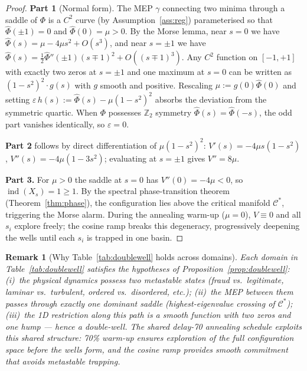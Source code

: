 \documentclass[11pt,a4paper]{article}
\newcommand{\Cman}{\mathcal{C}^*}
\DeclareMathOperator{\ind}{ind}
\newtheorem{remark}[theorem]{Remark}
\begin{document}
\begin{proof}
\textbf{Part 1} (Normal form).
The MEP $\gamma$ connecting two minima through a saddle of
$\Phi$ is a $C^2$ curve (by Assumption~\ref{ass:reg})
parameterised so that $\hat\Phi(\pm 1)=0$ and $\hat\Phi(0)=\mu>0$.
By the Morse lemma, near $s=0$ we have
$\hat\Phi(s)=\mu - 4\mu s^2 + O(s^3)$, and near $s=\pm 1$
we have $\hat\Phi(s)=\tfrac{1}{2}\hat\Phi''(\pm 1)(s\mp 1)^2
+O((s\mp 1)^3)$.
Any $C^2$ function on $[-1,+1]$ with exactly two zeros at
$s=\pm 1$ and one maximum at $s=0$ can be written as
$(1-s^2)^2\cdot g(s)$ with $g$ smooth and positive.
Rescaling $\mu:=g(0)\hat\Phi(0)$ and setting
$\varepsilon\,h(s):=\hat\Phi(s)-\mu(1-s^2)^2$ absorbs
the deviation from the symmetric quartic.
When $\Phi$ possesses $\mathbb{Z}_2$ symmetry $\hat\Phi(s)=\hat\Phi(-s)$,
the odd part vanishes identically, so $\varepsilon=0$.

\textbf{Part 2} follows by direct differentiation of
$\mu(1-s^2)^2$: $V'(s)=-4\mu s(1-s^2)$, $V''(s)=
-4\mu(1-3s^2)$; evaluating at $s=\pm 1$ gives $V''=8\mu$.

\textbf{Part 3.}
For $\mu>0$ the saddle at $s=0$ has
$V''(0)=-4\mu<0$, so $\ind(X_s)=1\ge 1$.
By the spectral phase-transition theorem
(Theorem~\ref{thm:phase}), the configuration lies above
the critical manifold $\Cman$, triggering the Morse alarm.
During the annealing warm-up ($\mu=0$), $V\equiv 0$ and all
$s_i$ explore freely; the cosine ramp breaks this degeneracy,
progressively deepening the wells until each $s_i$ is trapped
in one basin.%
\end{proof}

\begin{remark}[Why Table~\ref{tab:doublewell} holds across domains]
Each domain in Table~\ref{tab:doublewell} satisfies the hypotheses
of Proposition~\ref{prop:doublewell}: (i)~the physical dynamics
possess two metastable states (fraud vs.\ legitimate, laminar
vs.\ turbulent, ordered vs.\ disordered, etc.); (ii)~the MEP
between them passes through exactly one dominant saddle
(highest-eigenvalue crossing of $\Cman$); (iii)~the 1D restriction
along this path is a smooth function with two zeros and one hump
--- hence a double-well.  The shared delay-70 annealing schedule
exploits this shared structure: 70\% warm-up ensures exploration of the
full configuration space before the wells form, and the cosine ramp
provides smooth commitment that avoids metastable trapping.
\end{remark}

\end{document}
